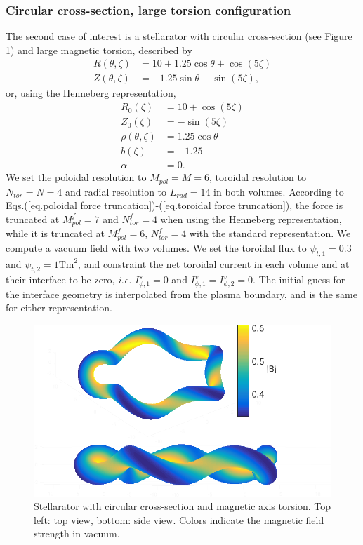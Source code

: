 \documentclass[my_thesis.tex]{subfiles}
\begin{document}
\subsubsection{Circular cross-section, large torsion configuration}
The second case of interest is a stellarator with circular cross-section (see Figure \ref{fig. circular stellarator geometry}) and large magnetic torsion, described by
\begin{align}
	R(\theta,\zeta) &= 10 + 1.25\cos\theta + \cos(5\zeta)\\
	Z(\theta,\zeta) &= -1.25\sin\theta - \sin(5\zeta), 
\end{align}
or, using the Henneberg representation,
\begin{align}
    R_0(\zeta) &= 10 + \cos(5\zeta)\\
	Z_0(\zeta) &= -\sin(5\zeta)\\
	\rho(\theta,\zeta) &= 1.25\cos\theta\\
	b(\zeta) &= -1.25\\
	\alpha &= 0.
\end{align}
We set the poloidal resolution to $M_{pol}=M=6$, toroidal resolution to $N_{tor}=N=4$ and radial resolution to $L_{rad}=14$ in both volumes. According to Eqs.(\ref{eq.poloidal force truncation})-(\ref{eq.toroidal force truncation}), the force is truncated at $M^f_{pol}=7$ and $N^f_{tor}=4$ when using the Henneberg representation, while it is truncated at $M_{pol}^f=6$, $N_{tor}^f=4$ with the standard representation. We compute a vacuum field with two volumes. We set the toroidal flux to $\psi_{t,1}=0.3$ and $\psi_{t,2}=1\text{Tm}^2$, and constraint the net toroidal current in each volume and at their interface to be zero, \textit{i.e.} $I^s_{\phi,1}=0$ and $I^v_{\phi,1}=I^v_{\phi,2}=0$. The initial guess for the interface geometry is interpolated from the plasma boundary, and is the same for either representation.
\begin{figure}
	\centering
	\includegraphics[width=.8\linewidth]{images/HennebergRepresentation/CircularTorsion_modB_boundary.png}
	\caption{Stellarator with circular cross-section and magnetic axis torsion. Top left: top view, bottom: side view. Colors indicate the magnetic field strength in vacuum.}
	\label{fig. circular stellarator geometry}
\end{figure}
\end{document}
